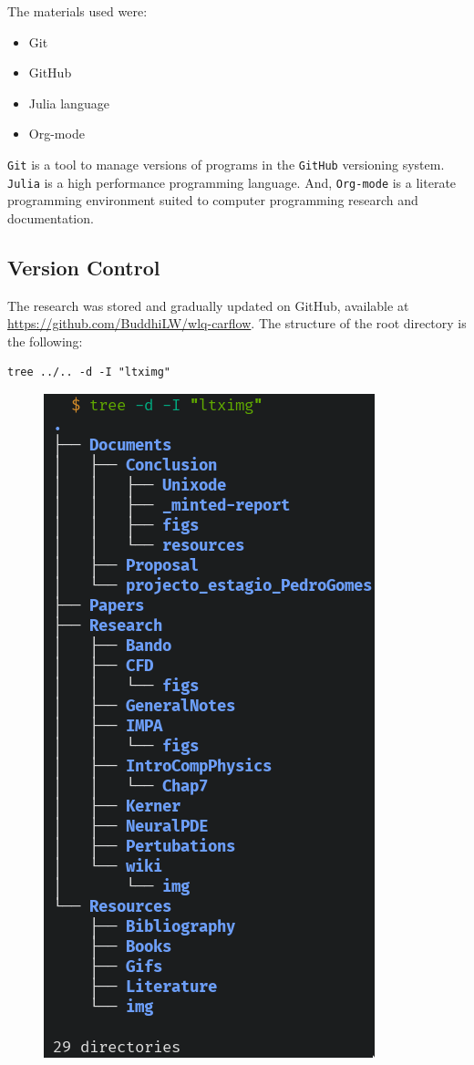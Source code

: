 \documentclass[11pt]{article}
\begin{document}
The materials used were:
\begin{itemize}
\item Git
\item GitHub
\item Julia language
\item Org-mode
\end{itemize}

\texttt{Git} is a tool to manage versions of programs in the \texttt{GitHub} versioning
system. \texttt{Julia} is a high performance programming language. And, \texttt{Org-mode} is a
literate programming environment suited to computer programming research and
documentation.

\subsection{Version Control}
\label{sec:orgb168ce4}
The research was stored and gradually updated on GitHub, available at \url{https://github.com/BuddhiLW/wlq-carflow}. The structure of the root directory is the following:

\begin{verbatim}
tree ../.. -d -I "ltximg"
\end{verbatim}

\begin{figure}[!htb]
  \centering
  \caption{\label{fig:dir} }
  \includegraphics[width=0.45\linewidth]{Resources/img/directories.png}
\end{figure}
\end{document}

